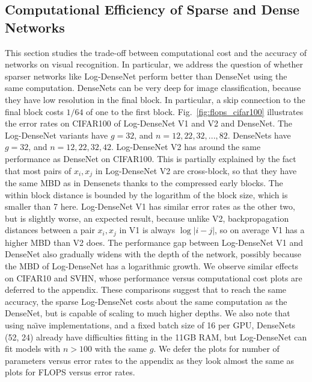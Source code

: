 \documentclass{article}
\newcommand{\logdense}{Log-DenseNet\xspace}
\newcommand{\pbd}{MBD\xspace}
\newcommand{\naive}{na\"{\i}ve\xspace}
\begin{document}

\subsection{Computational Efficiency of Sparse and Dense Networks}
\label{sec:exp-trade-off}
\vspace{-5pt}

This section studies the trade-off between computational cost and the accuracy of networks on visual recognition. In particular, we address the question of whether sparser networks like \logdense perform better than DenseNet using the same computation. DenseNets can be very deep for image classification, because they have low resolution in the final block. In particular, a skip connection to the final block costs $1/64$ of one to the first block. 
Fig.~\ref{fig:flops_cifar100} illustrates the error rates on CIFAR100 of \logdense V1 and V2 and DenseNet. The \logdense variants have $g=32$, and $n=12,22,32,...,82$. DenseNets have $g=32$, and $n=12,22,32,42$. \logdense V2 has around the same performance as DenseNet on CIFAR100. This is partially explained by the fact that most pairs of $x_i, x_j$ in \logdense V2 are cross-block, so that they have the same \pbd as in Densenets thanks to the compressed early blocks. The within block distance is bounded by the logarithm of the block size, which is smaller than 7 here.
\logdense V1 has similar error rates as the other two, but is slightly worse, an expected result, because unlike V2, backpropagation distances between a pair $x_i,x_j$ in V1 is always $ \log |i -j|$, so on average V1 has a higher \pbd than V2 does. 
The performance gap between \logdense V1 and DenseNet also gradually widens with the depth of the network, possibly because the \pbd of \logdense has a logarithmic growth. We observe similar effects on CIFAR10 and SVHN, whose performance versus computational cost plots are deferred to the appendix.
These comparisons suggest that to reach the same accuracy, the sparse \logdense costs about the same computation as the DenseNet, but is capable of scaling to much higher depths. 
We also note that using \naive implementations, and a fixed batch size of 16 per GPU, DenseNets (52, 24) already have difficulties fitting in the 11GB RAM, but \logdense can fit models with $n>100$ with the same $g$. We defer the plots for number of parameters versus error rates to the appendix as they look almost the same as plots for FLOPS versus error rates.
\end{document}
